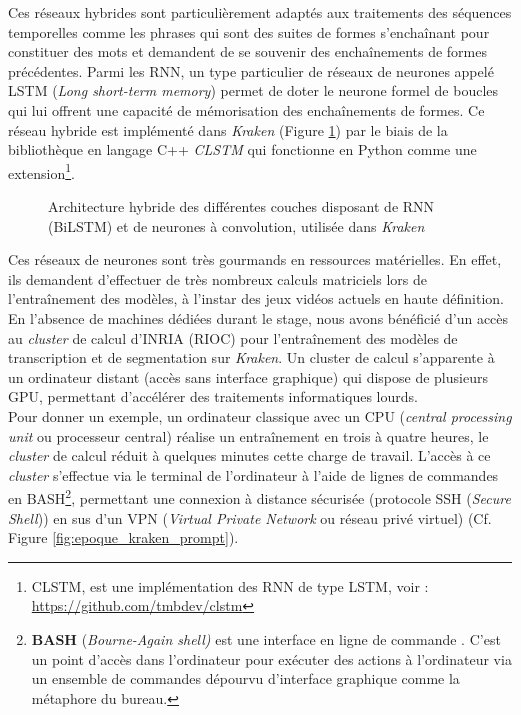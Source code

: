 Ces réseaux hybrides sont particulièrement adaptés aux traitements des séquences temporelles comme les phrases qui sont des suites de formes s'enchaînant pour constituer des mots et demandent de se souvenir des enchaînements de formes précédentes. Parmi les RNN, un type particulier de réseaux de neurones appelé LSTM (\textit{Long short-term memory}) permet de doter le neurone formel de boucles qui lui offrent une capacité de mémorisation des enchaînements de formes. Ce réseau hybride est implémenté dans \textit{Kraken} (Figure \ref{fig:graph_neurones_artificiels}) par le biais de la bibliothèque en langage C++ \textit{CLSTM} qui fonctionne en Python comme une extension\footnote{CLSTM, est une implémentation des RNN de type LSTM, voir : \url{https://github.com/tmbdev/clstm}}. 
\begin{figure}[h!]
    \centering
    \centerline{}
    \caption{Architecture hybride des différentes couches disposant de RNN (BiLSTM) et de neurones à convolution, utilisée dans \textit{Kraken} \textcopyright \cite{kiessling_kraken_2019}}
    \label{fig:graph_neurones_artificiels}
\end{figure}
\newpage
Ces réseaux de neurones sont très gourmands en ressources matérielles. En effet, ils demandent d'effectuer de très nombreux calculs matriciels lors de l'entraînement des modèles, à l'instar des jeux vidéos actuels en haute définition. En l'absence de machines dédiées durant le stage, nous avons bénéficié d'un accès au \textit{cluster} de calcul d'INRIA (RIOC) pour l'entraînement des modèles de transcription et de segmentation sur \textit{Kraken}. Un cluster de calcul s'apparente à un ordinateur distant (accès sans interface graphique) qui dispose de plusieurs GPU, permettant d'accélérer des traitements informatiques lourds.\\ 

Pour donner un exemple, un ordinateur classique avec un CPU (\textit{central processing unit} ou processeur central) réalise un entraînement en trois à quatre heures, le \textit{cluster} de calcul réduit à quelques minutes cette charge de travail. L'accès à ce \textit{cluster} s'effectue via le terminal de l'ordinateur à l'aide de lignes de commandes en BASH\footnote{\textbf{BASH} (\textit{Bourne-Again shell)} est une interface en ligne de commande . C'est un point d'accès dans l'ordinateur pour exécuter des actions à l'ordinateur via un ensemble de commandes dépourvu d'interface graphique comme la métaphore du bureau.}, permettant une connexion à distance sécurisée (protocole SSH (\textit{Secure Shell})) en sus d'un VPN (\textit{Virtual Private Network} ou réseau privé virtuel) (Cf. Figure \ref{fig:epoque_kraken_prompt}).
\newpage
